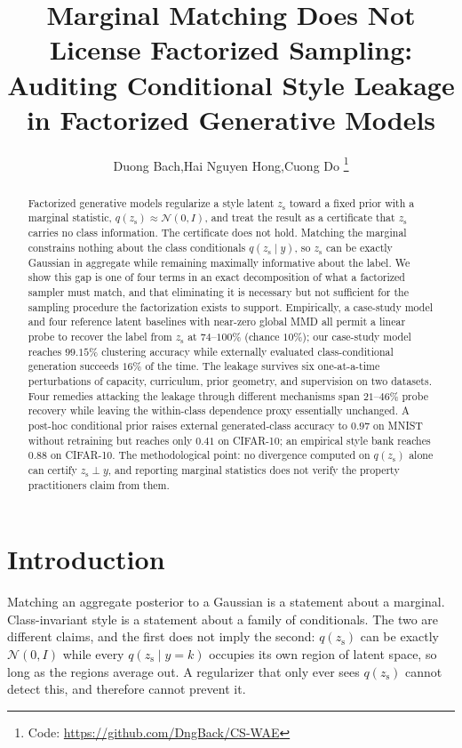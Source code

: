 \documentclass[letterpaper]{article}
\title{Marginal Matching Does Not License Factorized Sampling:\\
Auditing Conditional Style Leakage in Factorized Generative Models}
\author{
  Duong Bach,\quad Hai Nguyen Hong,\quad Cuong Do%
  \thanks{Code: \protect\url{https://github.com/DngBack/CS-WAE}}
}
\newcommand{\zs}{z_{\mathrm{s}}}
\begin{document}
\maketitle

\begin{abstract}
Factorized generative models regularize a style latent $\zs$ toward a fixed
prior with a marginal statistic, $q(\zs)\approx\mathcal N(0,I)$, and treat
the result as a certificate that $\zs$ carries no class information. The
certificate does not hold. Matching the marginal constrains nothing about
the class conditionals $q(\zs\mid y)$, so $\zs$ can be exactly Gaussian in
aggregate while remaining maximally informative about the label. We show
this gap is one of four terms in an exact decomposition of what a factorized
sampler must match, and that eliminating it is necessary but not sufficient
for the sampling procedure the factorization exists to support. Empirically,
a case-study model and four reference latent baselines with near-zero global
MMD all permit a linear probe to recover the label from $\zs$ at
$74$--$100\%$ (chance $10\%$); our case-study
model reaches $99.15\%$ clustering accuracy while externally evaluated
class-conditional generation succeeds $16\%$ of the time. The leakage
survives six one-at-a-time perturbations of capacity, curriculum, prior
geometry, and supervision on two datasets. Four remedies attacking the leakage through
different mechanisms span $21$--$46\%$ probe recovery while leaving the
within-class dependence proxy essentially unchanged. A post-hoc conditional
prior raises external generated-class accuracy to $0.97$ on MNIST without
retraining but reaches only $0.41$ on CIFAR-10; an empirical style bank
reaches $0.88$ on CIFAR-10. The methodological point: no divergence computed
on $q(\zs)$ alone can certify $\zs\perp y$, and reporting marginal statistics
does not verify the property practitioners claim from them.
\end{abstract}

\section{Introduction}
\label{sec:intro}

Matching an aggregate posterior to a Gaussian is a statement about a
marginal. Class-invariant style is a statement about a family of
conditionals. The two are different claims, and the first does not imply the
second: $q(\zs)$ can be exactly $\mathcal N(0,I)$ while every $q(\zs\mid
y{=}k)$ occupies its own region of latent space, so long as the regions
average out. A regularizer that only ever sees $q(\zs)$ cannot detect this,
and therefore cannot prevent it.
\end{document}
